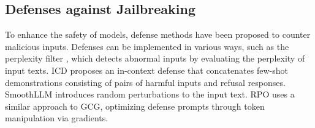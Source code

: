 \subsection{Defenses against Jailbreaking}
To enhance the safety of models, defense methods have been proposed to counter malicious inputs. Defenses can be implemented in various ways, such as the perplexity filter \cite{Alon2023DetectingLM}, which detects abnormal inputs by evaluating the perplexity of input texts. ICD \cite{Wei2023JailbreakAG} proposes an in-context defense that concatenates few-shot demonstrations consisting of pairs of harmful inputs and refusal responses. SmoothLLM \cite{Robey2023SmoothLLMDL} introduces random perturbations to the input text. RPO \cite{Zhou2024RobustPO} uses a similar approach to GCG, optimizing defense prompts through token manipulation via gradients.

